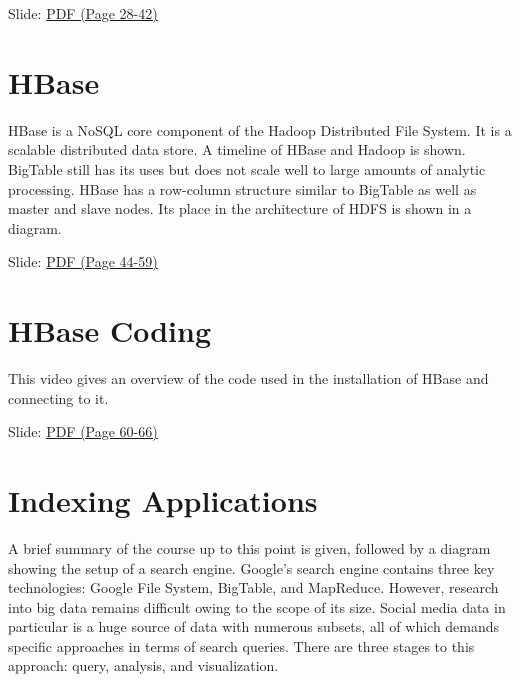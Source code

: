   Slide:
  \href{https://drive.google.com/open?id=0B88HKpainTSfaDFNbjNiMm44bnc}{PDF
  (Page 28-42)}

\section{HBase}

HBase is a NoSQL core component of the Hadoop Distributed File System.
It is a scalable distributed data store. A timeline of HBase and Hadoop
is shown. BigTable still has its uses but does not scale well to large
amounts of analytic processing. HBase has a row-column structure similar
to BigTable as well as master and slave nodes. Its place in the
architecture of HDFS is shown in a diagram.


  Slide:
  \href{https://drive.google.com/open?id=0B88HKpainTSfaDFNbjNiMm44bnc}{PDF
  (Page 44-59)}

\section{HBase Coding}

This video gives an overview of the code used in the installation of
HBase and connecting to it.


  Slide:
  \href{https://drive.google.com/open?id=0B88HKpainTSfaDFNbjNiMm44bnc}{PDF
  (Page 60-66)}

\section{Indexing Applications}

A brief summary of the course up to this point is given, followed by a
diagram showing the setup of a search engine. Google's search engine
contains three key technologies: Google File System, BigTable, and
MapReduce. However, research into big data remains difficult owing to
the scope of its size. Social media data in particular is a huge source
of data with numerous subsets, all of which demands specific approaches
in terms of search queries. There are three stages to this approach:
query, analysis, and visualization.


